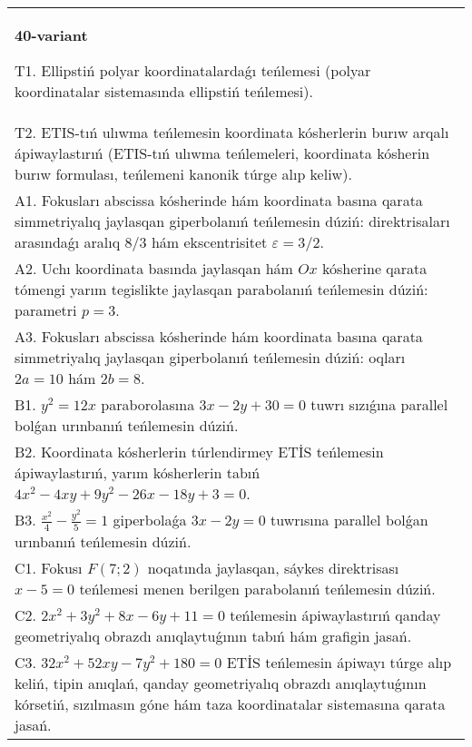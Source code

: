 \documentclass{article}
\begin{document}
\begin{tabular}{m{17cm}}
\textbf{40-variant}
\newline

T1. Ellipstiń polyar koordinatalardaǵı teńlemesi (polyar koordinatalar sistemasında ellipstiń teńlemesi).\\

T2. ETIS-tıń ulıwma teńlemesin koordinata kósherlerin burıw arqalı ápiwaylastırıń (ETIS-tıń ulıwma teńlemeleri, koordinata kósherin burıw formulası, teńlemeni kanonik túrge alıp keliw).\\

A1. Fokusları abscissa kósherinde hám koordinata basına qarata simmetriyalıq jaylasqan giperbolanıń teńlemesin dúziń: direktrisaları arasındaǵı aralıq $8/3$ hám ekscentrisitet $\varepsilon=3/2$.\\

A2. Uchı koordinata basında jaylasqan hám $Ox$ kósherine qarata tómengi yarım tegislikte jaylasqan parabolanıń teńlemesin dúziń: parametri $p=3$.\\

A3. Fokusları abscissa kósherinde hám koordinata basına qarata simmetriyalıq jaylasqan giperbolanıń teńlemesin dúziń: oqları $2 a=10$ hám $2 b=8$.\\

B1. $y^{2} = 12x$ paraborolasına $3x - 2y + 30 = 0$ tuwrı sızıǵına parallel bolǵan urınbanıń teńlemesin dúziń.  \\

B2. Koordinata kósherlerin túrlendirmey ETİS teńlemesin ápiwaylastırıń, yarım kósherlerin tabıń $4x^{2} - 4xy + 9y^{2} - 26x - 18y + 3 = 0$.\\

B3. $\frac{x^{2}}{4} - \frac{y^{2}}{5} = 1$ giperbolaǵa $3x - 2y = 0$ tuwrısına parallel bolǵan urınbanıń teńlemesin dúziń.  \\

C1. Fokusı $F(7;2)$ noqatında jaylasqan, sáykes direktrisası $x - 5 = 0$ teńlemesi menen berilgen parabolanıń teńlemesin dúziń.  \\

C2. $2x^{2} + 3y^{2} + 8x - 6y + 11 = 0$ teńlemesin ápiwaylastırıń qanday geometriyalıq obrazdı anıqlaytuǵının tabıń hám grafigin jasań.\\

C3. $32x^{2} + 52xy - 7y^{2} + 180 = 0$ ETİS teńlemesin ápiwayı túrge alıp keliń, tipin anıqlań, qanday geometriyalıq obrazdı anıqlaytuǵının kórsetiń, sızılmasın góne hám taza koordinatalar sistemasına qarata jasań.  \\

\end{tabular}
\vspace{1cm}
\end{document}
